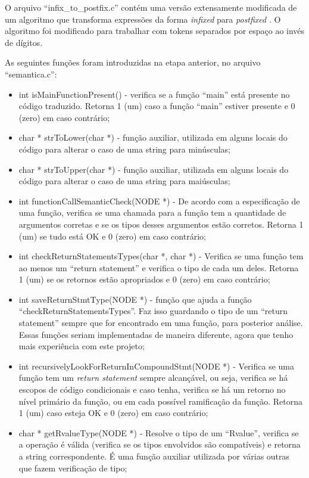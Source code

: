 \documentclass[12pt]{article}
\begin{document}
O arquivo ``infix\_to\_postfix.c'' contém uma versão extensamente modificada de um algoritmo que transforma expressões da forma \textit{infixed} para \textit{postfixed} \cite{raju}. O algoritmo foi modificado para trabalhar com tokens separados por espaço ao invés de dígitos.

As seguintes funções foram introduzidas na etapa anterior, no arquivo ``semantica.c'':

\begin{itemize}
	\item int isMainFunctionPresent() - verifica se a função ``main'' está presente no código traduzido. Retorna 1 (um) caso a função ``main'' estiver presente e 0 (zero) em caso contrário;
	\item char * strToLower(char *) - função auxiliar, utilizada em alguns locais do código para alterar o caso de uma string para minúsculas;
	\item char * strToUpper(char *) - função auxiliar, utilizada em alguns locais do código para alterar o caso de uma string para maiúsculas;
	\item int functionCallSemanticCheck(NODE *) - De acordo com a especificação de uma função, verifica se uma chamada para a função tem a quantidade de argumentos corretas e se os tipos desses argumentos estão corretos. Retorna 1 (um) se tudo está OK e 0 (zero) em caso contrário;
	\item int checkReturnStatementsTypes(char *, char *) - Verifica se uma função tem ao menos um ``return statement'' e verifica o tipo de cada um deles. Retorna 1 (um) se os retornos estão apropriados e 0 (zero) em caso contrário;
	\item int saveReturnStmtType(NODE *) - função que ajuda a função ``checkReturnStatementsTypes''. Faz isso guardando o tipo de um ``return statement'' sempre que for encontrado em uma função, para posterior análise. Essas funções seriam implementadas de maneira diferente, agora que tenho mais experiência com este projeto;
	\item int recursivelyLookForReturnInCompoundStmt(NODE *) - Verifica se uma função tem um \textit{return statement} sempre alcançável, ou seja, verifica se há escopos de código condicionais e caso tenha, verifica se há um retorno no nível primário da função, ou em cada possível ramificação da função. Retorna 1 (um) caso esteja OK e 0 (zero) em caso contrário;
	\item char * getRvalueType(NODE *) - Resolve o tipo de um ``Rvalue'', verifica se a operação é válida (verifica se os tipos envolvidos são compatíveis) e retorna a string correspondente. É uma função auxiliar utilizada por várias outras que fazem verificação de tipo;

\end{itemize}
\end{document}

